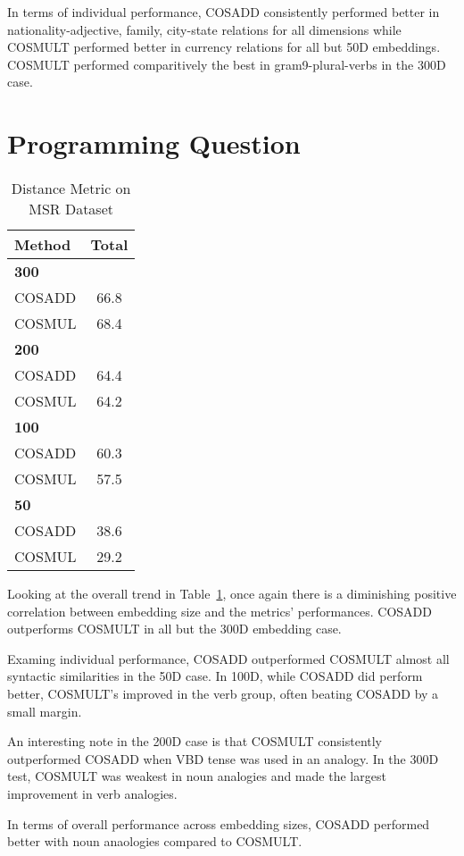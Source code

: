 \documentclass{article}
\begin{document}
In terms of individual performance, COSADD consistently performed better in
nationality-adjective, family, city-state  relations for all dimensions while COSMULT performed
better in currency relations for all but 50D embeddings. COSMULT performed
comparitively the best in gram9-plural-verbs in the 300D case.

\section{Programming Question}

\begin{table}[h]
\centering
\caption{Distance Metric on MSR Dataset}
\label{msr}
\begin{tabular}{|l||c|}
  \hline
  Method & Total \\
  \hline
  \bf{300} & \\
  \hline
  COSADD  & 66.8 \\
  COSMUL  & 68.4 \\
  \hline
  \bf{200} & \\
  \hline
  COSADD & 64.4 \\
  COSMUL & 64.2 \\
  \hline
  \bf{100} & \\
  \hline
  COSADD & 60.3 \\
  COSMUL & 57.5 \\
  \hline
  \bf{50}& \\
  \hline
  COSADD & 38.6 \\
  COSMUL & 29.2 \\
  \hline
\end{tabular}
\end{table}

Looking at the overall trend in Table~\ref{msr}, once again there is a
diminishing positive correlation between embedding size and the metrics'
performances. COSADD outperforms COSMULT in all but the 300D embedding case.

Examing individual performance, COSADD outperformed COSMULT almost all syntactic
similarities in the 50D case. In 100D, while COSADD did perform better,
COSMULT's improved in the verb group, often beating COSADD by a small margin.

An interesting note in the 200D
case is that COSMULT consistently outperformed COSADD when VBD tense was used in
an analogy. In the 300D test, COSMULT was weakest in noun analogies and made the
largest improvement in verb analogies.

In terms of overall performance across embedding sizes, COSADD performed better
with noun anaologies compared to COSMULT.
\end{document}
